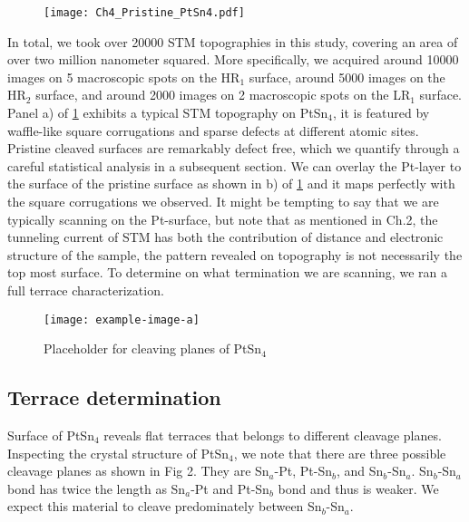 \begin{figure}
	\centering
	\texttt{[image: Ch4\_Pristine\_PtSn4.pdf]}
	\caption{ }
	\label{fig:ch4_pristinetopo}
\end{figure}

\par In total, we took over 20000 STM topographies in this study, covering an area of over two million nanometer squared. More specifically, we acquired around 10000 images on 5 macroscopic spots on the HR$_1$ surface, around 5000 images on the HR$_2$ surface, and around 2000 images on 2 macroscopic spots on the LR$_1$ surface. 
Panel a) of \ref{fig:ch4_pristinetopo} exhibits a typical STM topography on PtSn$_4$, it is featured by waffle-like square corrugations and sparse defects at different atomic sites. Pristine cleaved surfaces are remarkably defect free, which we quantify through a careful statistical analysis in a subsequent section. We can overlay the Pt-layer to the surface of the pristine surface as shown in b) of \ref{fig:ch4_pristinetopo} and it maps perfectly with the square corrugations we observed. It might be tempting to say that we are typically scanning on the Pt-surface, but note that as mentioned in Ch.2, the tunneling current of STM has both the contribution of distance and electronic structure of the sample, the pattern revealed on topography is not necessarily the top most surface. To determine on what termination we are scanning, we ran a full terrace characterization.

\begin{figure}
	\centering
	\texttt{[image: example-image-a]} %
	\caption{Placeholder for cleaving planes of PtSn$_4$}
	\label{fig:ch4_cleavingplane}
\end{figure}


\subsection{Terrace determination}
\par Surface of PtSn$_4$ reveals flat terraces that belongs to different cleavage planes. Inspecting the crystal structure of PtSn$_4$, we note that there are three possible cleavage planes as shown in Fig 2. They are Sn$_a$-Pt, Pt-Sn$_b$, and Sn$_b$-Sn$_a$. Sn$_b$-Sn$_a$ bond has twice the length as Sn$_a$-Pt and Pt-Sn$_b$ bond and thus is weaker. We expect this material to cleave predominately between Sn$_b$-Sn$_a$. 

